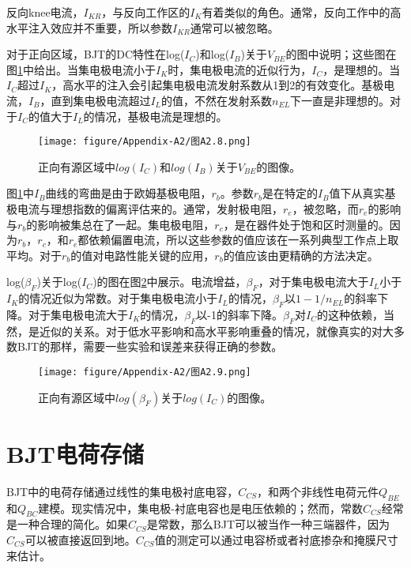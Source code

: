 反向knee电流，$I_{KR}$，与反向工作区的$I_K$有着类似的角色。通常，反向工作中的高水平注入效应并不重要，所以参数$I_{KR}$通常可以被忽略。

对于正向区域，BJT的DC特性在log($I_C$)和log($I_B$)关于$V_{BE}$的图中说明；这些图在图\ref{图A2.8}中给出。当集电极电流小于$I_K$时，集电极电流的近似行为，$I_C$，是理想的。当$I_C$超过$I_K$，高水平的注入会引起集电极电流发射系数从1到2的有效变化。基极电流，$I_B$，直到集电极电流超过$I_L$的值，不然在发射系数$n_{EL}$下一直是非理想的。对于$I_C$的值大于$I_L$的情况，基极电流是理想的。

\begin{figure}[htbp]
\small
    \centering
    \texttt{[image: figure/Appendix-A2/图A2.8.png]}
    \caption{正向有源区域中$log(I_C)$和$log(I_B)$关于$V_{BE}$的图像。}
    \label{图A2.8}
\end{figure}

图\ref{图A2.8}中$I_B$曲线的弯曲是由于欧姆基极电阻，$r_b$。参数$r_b$是在特定的$I_B$值下从真实基极电流与理想指数的偏离评估来的。通常，发射极电阻，$r_e$，被忽略，而$r_e$的影响与$r_b$的影响被集总在了一起。集电极电阻，$r_c$，是在器件处于饱和区时测量的。因为$r_b$，$r_c$，和$r_e$都依赖偏置电流，所以这些参数的值应该在一系列典型工作点上取平均。对于$r_b$的值对电路性能关键的应用，$r_b$的值应该由更精确的方法决定\cite{ref-87}。

log($\beta_F$)关于log($I_C$)的图在图\ref{图A2.9}中展示。电流增益，$\beta_F$，对于集电极电流大于$I_L$小于$I_K$的情况近似为常数。对于集电极电流小于$I_L$的情况，$\beta_F$以$1-1/n_{EL}$的斜率下降。对于集电极电流大于$I_K$的情况，$\beta_F$以-1的斜率下降。$\beta_F$对$I_C$的这种依赖，当然，是近似的关系。对于低水平影响和高水平影响重叠的情况，就像真实的对大多数BJT的那样，需要一些实验和误差来获得正确的参数。
\begin{figure}[htbp]
\small
    \centering
    \texttt{[image: figure/Appendix-A2/图A2.9.png]}
    \caption{正向有源区域中$log(\beta_F)$关于$log(I_C)$的图像。}
    \label{图A2.9}
\end{figure}

\section{BJT电荷存储}
BJT中的电荷存储通过线性的集电极衬底电容，$C_{CS}$，和两个非线性电荷元件$Q_{BE}$和$Q_{BC}$建模。现实情况中，集电极-衬底电容也是电压依赖的；然而，常数$C_{CS}$经常是一种合理的简化。如果$C_{CS}$是常数，那么BJT可以被当作一种三端器件，因为$C_{CS}$可以被直接返回到地。$C_{CS}$值的测定可以通过电容桥或者衬底掺杂和掩膜尺寸来估计。

